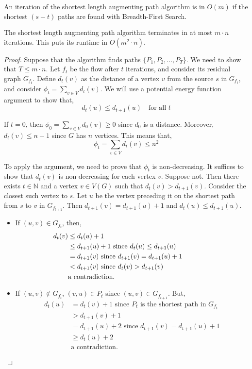 	\begin{rmk}
		An iteration of the shortest length augmenting path algorithm is in $O(m)$ if the shortest $(s-t)$ paths are found with Breadth-First Search.
	\end{rmk}

	\begin{thm}
		The shortest length augmenting path algorithm terminates in at most $m \cdot n$ iterations. This puts its runtime in $O(m^2 \cdot n)$.
	\end{thm}

	\begin{proof}
		Suppose that the algorithm finds paths $\{P_1, P_2, \dots, P_T\}$. We need to show that $T \leq m \cdot n$. Let $f_t$ be the flow after $t$ iterations, and consider its residual graph $G_{f_t}$. Define $d_t(v)$ as the distance of a vertex $v$ from the source $s$ in $G_{f_t}$, and consider $\phi_t = \sum_{v \in V} d_t(v)$. We will use a potential energy function argument to show that,
		\[d_t(u) \leq d_{t+1}(u) \quad \text{for all $t$}\]
		
		\noindent If $t = 0$, then $\phi_0 = \sum_{v \in V} d_0(v) \geq 0$ since $d_0$ is a distance. Moreover, $d_t(v) \leq n - 1$ since $G$ has $n$ vertices. This means that,
		\[\phi_t = \sum_{v \in V}d_t(v) \leq n^2\]

		\noindent To apply the argument, we need to prove that $\phi_t$ is non-decreasing. It suffices to show that $d_t(v)$ is non-decreasing for each vertex $v$. Suppose not. Then there exists $t \in \mathbb{N}$ and a vertex $v \in V(G)$ such that $d_t(v) > d_{t+1}(v)$. Consider the closest such vertex to $s$. Let $u$ be the vertex preceding it on the shortest path from $s$ to $v$ in $G_{f_{t+1}}$. Then $d_{t+1}(v) = d_{t+1}(u) + 1$ and $d_t(u) \leq d_{t+1}(u)$.
		\begin{itemize}
			\item If $(u,v) \in G_{f_t}$, then,	
			\begin{align*}
				d_t(v) &\leq d_t(u) + 1 \text{\phantom{ since $P_t$ is the shortest path in $G_{f_t}$}}\\
							 &\leq d_{t+1}(u) + 1 \text{ since $d_t(u) \leq d_{t+1}(u)$} \\
							 &= d_{t+1}(v) \text{ since $d_{t+1}(v) = d_{t+1}(u)+1$} \\
							 &< d_{t+1}(v) \text{ since $d_t(v) > d_{t+1}(v)$} \\
							 &\text{a contradiction.}
			\end{align*}
			\item If $(u,v) \not\in G_{f_t}$, $(v,u) \in P_t$ since $(u,v) \in G_{f_{t+1}}$. But,
			\begin{align*}
				d_t(u) &= d_t(v) + 1 \text{ since $P_t$ is the shortest path in $G_{f_t}$} \\
						   &> d_{t+1}(v) + 1 \\ 
						   &= d_{t+1}(u) + 2 \text{ since $d_{t+1}(v) = d_{t+1}(u)+1$} \\
						   &\geq d_t(u) + 2 \\
						   &\text{a contradiction.}
			\end{align*}
		\end{itemize}


\end{proof}
